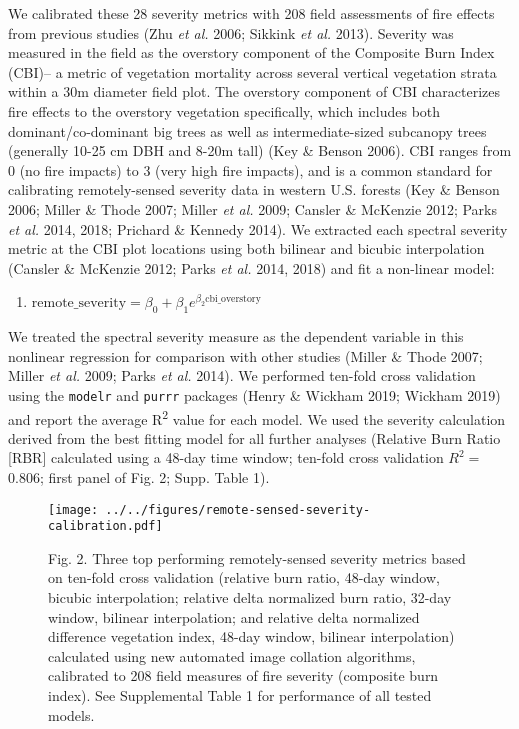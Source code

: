 \documentclass[]{article}
\providecommand{\tightlist}{%
  \setlength{\itemsep}{0pt}\setlength{\parskip}{0pt}}
\begin{document}
We calibrated these 28 severity metrics with 208 field assessments of
fire effects from previous studies (Zhu \emph{et al.} 2006; Sikkink
\emph{et al.} 2013). Severity was measured in the field as the overstory
component of the Composite Burn Index (CBI)-- a metric of vegetation
mortality across several vertical vegetation strata within a 30m
diameter field plot. The overstory component of CBI characterizes fire
effects to the overstory vegetation specifically, which includes both
dominant/co-dominant big trees as well as intermediate-sized subcanopy
trees (generally 10-25 cm DBH and 8-20m tall) (Key \& Benson 2006). CBI
ranges from 0 (no fire impacts) to 3 (very high fire impacts), and is a
common standard for calibrating remotely-sensed severity data in western
U.S. forests (Key \& Benson 2006; Miller \& Thode 2007; Miller \emph{et
al.} 2009; Cansler \& McKenzie 2012; Parks \emph{et al.} 2014, 2018;
Prichard \& Kennedy 2014). We extracted each spectral severity metric at
the CBI plot locations using both bilinear and bicubic interpolation
(Cansler \& McKenzie 2012; Parks \emph{et al.} 2014, 2018) and fit a
non-linear model:

\begin{enumerate}
\def\labelenumi{(\arabic{enumi})}
\tightlist
\item
  \(\label{eq-cbi-calibration} \text{remote\_severity} = \beta_0 + \beta_1 e^{\beta_2 \text{cbi\_overstory}}\)
\end{enumerate}

We treated the spectral severity measure as the dependent variable in
this nonlinear regression for comparison with other studies (Miller \&
Thode 2007; Miller \emph{et al.} 2009; Parks \emph{et al.} 2014). We
performed ten-fold cross validation using the \texttt{modelr} and
\texttt{purrr} packages (Henry \& Wickham 2019; Wickham 2019) and report
the average R\textsuperscript{2} value for each model. We used the
severity calculation derived from the best fitting model for all further
analyses (Relative Burn Ratio {[}RBR{]} calculated using a 48-day time
window; ten-fold cross validation \(R^2 =\) 0.806; first panel of Fig.
2; Supp. Table 1).

\begin{figure}
\centering
\texttt{[image: ../../figures/remote-sensed-severity-calibration.pdf]}
\caption{Fig. 2. Three top performing remotely-sensed severity metrics
based on ten-fold cross validation (relative burn ratio, 48-day window,
bicubic interpolation; relative delta normalized burn ratio, 32-day
window, bilinear interpolation; and relative delta normalized difference
vegetation index, 48-day window, bilinear interpolation) calculated
using new automated image collation algorithms, calibrated to 208 field
measures of fire severity (composite burn index). See Supplemental Table
1 for performance of all tested models.}
\end{figure}
\end{document}
